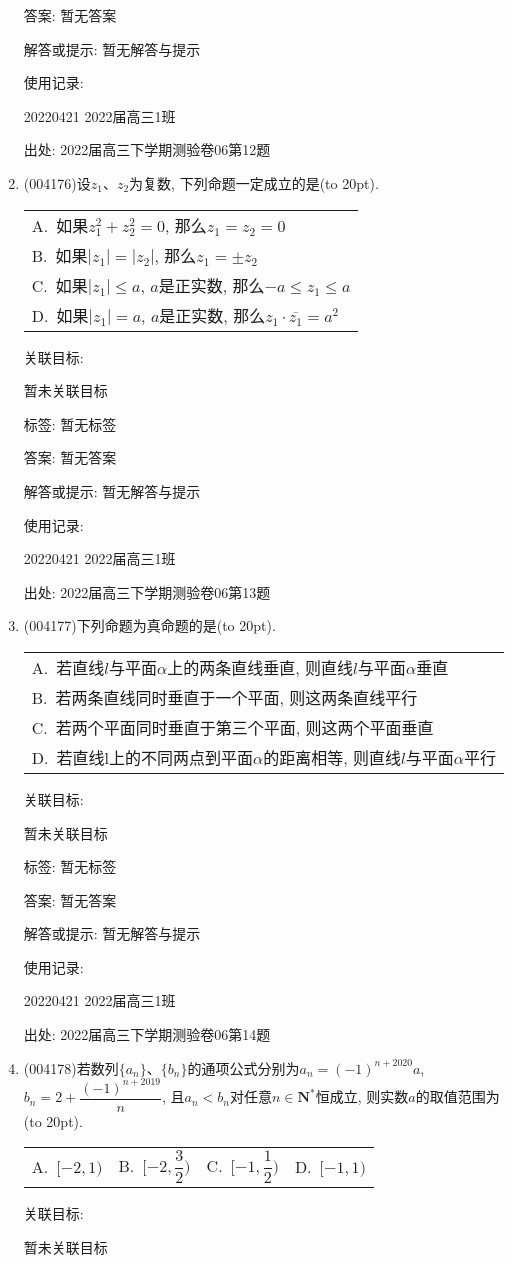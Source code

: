 \documentclass[10pt,a4paper]{article}
\newcommand{\bracket}[1]{(\hbox to #1pt{})}
\newcommand{\onech}[4]{\par\begin{tabular}{p{.9\textwidth}}
A.~#1\\
B.~#2\\
C.~#3\\
D.~#4
\end{tabular}}
\newcommand{\fourch}[4]{\par\begin{tabular}{p{.23\textwidth}p{.23\textwidth}p{.23\textwidth}p{.23\textwidth}}
A.~#1 &B.~#2& C.~#3& D.~#4
\end{tabular}}
\begin{document}
\begin{enumerate}[1.]
答案: 暂无答案

解答或提示: 暂无解答与提示

使用记录:

20220421	2022届高三1班	


出处: 2022届高三下学期测验卷06第12题
\item { (004176)}设$z_1$、$z_2$为复数, 下列命题一定成立的是\bracket{20}.
\onech{如果$z_1^2+z_2^2=0$, 那么$z_1=z_2=0$}{如果$|z_1 |=|z_2 |$, 那么$z_1=\pm z_2$}{如果$|z_1 |\le a$, $a$是正实数, 那么$-a\le {z_1}\le a$}{如果$|z_1|=a$, $a$是正实数, 那么$z_1\cdot \overline{z_1}=a^2$}


关联目标:

暂未关联目标



标签: 暂无标签

答案: 暂无答案

解答或提示: 暂无解答与提示

使用记录:

20220421	2022届高三1班	


出处: 2022届高三下学期测验卷06第13题
\item { (004177)}下列命题为真命题的是\bracket{20}.
\onech{若直线$l$与平面$\alpha$上的两条直线垂直, 则直线$l$与平面$\alpha$垂直}{若两条直线同时垂直于一个平面, 则这两条直线平行}{若两个平面同时垂直于第三个平面, 则这两个平面垂直}{若直线l上的不同两点到平面$\alpha$的距离相等, 则直线$l$与平面$\alpha$平行}


关联目标:

暂未关联目标



标签: 暂无标签

答案: 暂无答案

解答或提示: 暂无解答与提示

使用记录:

20220421	2022届高三1班	


出处: 2022届高三下学期测验卷06第14题
\item { (004178)}若数列$\{a_n\}$、$\{b_n\}$的通项公式分别为$a_n=(-1)^{n+2020}a$, $b_n=2+\dfrac{{(-1)}^{n+2019}}n$, 且$a_n<b_n$对任意$n\in \mathbf{N}^*$恒成立, 则实数$a$的取值范围为\bracket{20}.
\fourch{$[-2,1)$}{$[-2,\dfrac 32)$}{$[-1,\dfrac 12)$}{$[-1,1)$}


关联目标:

暂未关联目标




\end{enumerate}
\end{document}
